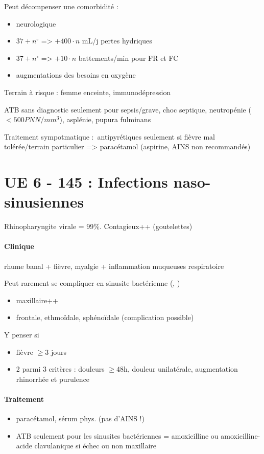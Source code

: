 \documentclass{article}
\begin{document}
Peut décompenser une comorbidité :

\begin{itemize}
\tightlist
\item
  neurologique
\item
  \(37 + n^\circ\) =\textgreater{} \(+400\cdot n\) mL/j pertes hydriques
\item
  \(37 + n^\circ\) =\textgreater{} \(+10 \cdot n\) battements/min pour
  FR et FC
\item
  augmentations des besoins en oxygène
\end{itemize}

Terrain à risque : femme enceinte, immunodépression

\danger ATB sans diagnostic seulement pour sepsis/grave, choc septique,
neutropénie (\(< 500 PNN/mm^3\)), asplénie, pupura fulminans

Traitement sympotmatique :~antipyrétiques seulement si fièvre mal
tolérée/terrain particulier =\textgreater{} paracétamol (aspirine, AINS
non recommandés)

\section{UE 6 - 145 : Infections naso-sinusiennes}%
\label{sec:item_145_infections_naso_sinusiennes}

Rhinopharyngite virale =  99\%. Contagieux++ (goutelettes)

\paragraph{Clinique} rhume banal + fièvre, myalgie + inflammation muqueuses respiratoire

Peut rarement se compliquer en sinusite bactérienne (,
)
\begin{itemize}
  \item maxillaire++
  \item frontale, ethmoïdale, sphénoïdale (complication possible)
\end{itemize}
Y penser si 
\begin{itemize}
  \item fièvre $\ge 3$ jours
    \item 2 parmi 3 critères : douleurs $\ge 48$h, douleur unilatérale,
      augmentation rhinorrhée et purulence
\end{itemize}

\paragraph{Traitement}%
\label{par:traitement}
\begin{itemize}
  \item paracétamol, sérum phys. (pas d'AINS !)
  \item ATB seulement pour les sinusites bactériennes = amoxicilline ou
    amoxicilline-acide clavulanique si échec ou non maxillaire
\end{itemize}
\end{document}
